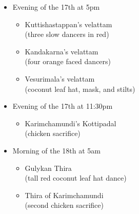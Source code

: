 \documentclass[a4paper, 11pt]{article} %
\begin{document}
\begin{itemize}
  \item Evening of the 17th at 5pm
  \begin{itemize}
    \item Kuttishastappan's velattam\\
      (three slow dancers in red)
    \item Kandakarna's velattam\\
      (four orange faced dancers)
    \item Vesurimala's velattam\\
      (coconut leaf hat, mask, and stilts)
  \end{itemize}
  \item Evening of the 17th at 11:30pm
  \begin{itemize}
    \item Karimchamundi's Kottipadal\\
      (chicken sacrifice)
  \end{itemize}
  \item Morning of the 18th at 5am
  \begin{itemize}
    \item Gulykan Thira\\
      (tall red coconut leaf hat dance)
    \item Thira of Karimchamundi\\
      (second chicken sacrifice)
  \end{itemize}
\end{itemize}















\vfill

\end{document}
